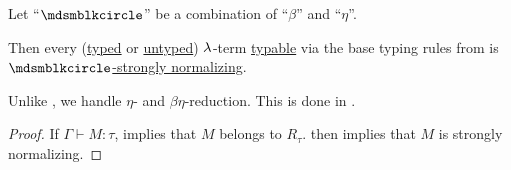 \begin{theorem}\label{thm:simply_typable_terms_are_strongly_normalizing}
  Let \enquote{\( {\Anon} \)} be a combination of \enquote{\( \beta \)} and \enquote{\( \eta \)}.

  Then every (\hyperref[def:typed_lambda_term]{typed} or \hyperref[def:lambda_term]{untyped}) \( \mathrm{\lambda} \)-term \hyperref[def:typability]{typable} via the base typing rules from  is \hyperref[def:strongly_normalizing_lambda_term]{\( \Anon \)-strongly normalizing}.
\end{theorem}
\begin{comments}
  \item Unlike , we handle \( \eta \)- and \( \beta\eta \)-reduction. This is done in .
\end{comments}
\begin{proof}
  If \( \Gamma \vdash M: \tau \),  implies that \( M \) belongs to \( R_\tau \).  then implies that \( M \) is strongly normalizing.
\end{proof}
